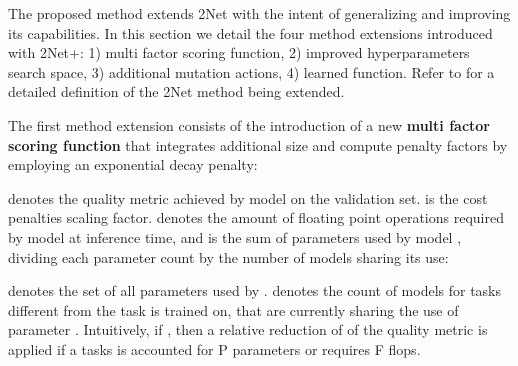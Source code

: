 \documentclass{article} \usepackage{iclr2023_conference,times}
\newcommand{\method}{2Net+\xspace}
\begin{document}
The proposed method extends 2Net \citep{Gesmundo2022munet2} with the intent of generalizing and improving its capabilities.
In this section we detail the four method extensions introduced with \method:
1) multi factor scoring function, 2) improved hyperparameters search space, 3) additional mutation actions, 4) learned  function.
Refer to \cite{Gesmundo2022munet2} for a detailed definition of the 2Net method being extended.

The first method extension consists of the introduction of a new \textbf{multi factor scoring function} that integrates additional size and compute penalty factors by employing an exponential decay penalty:

 denotes the quality metric achieved by model  on the validation set.
 is the cost penalties scaling factor.
 denotes the amount of floating point operations required by model  at inference time,
and  is the sum of parameters used by model ,
dividing each parameter count by the number of models sharing its use:

 denotes the set of all parameters used by .
 denotes the count of models for tasks different from the task  is trained on, that are currently sharing the use of parameter .
Intuitively, if , then a relative reduction of  of the quality metric is applied if a tasks is accounted for P parameters or requires F flops.
\end{document}
